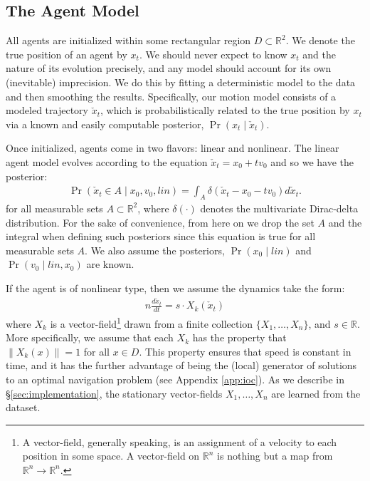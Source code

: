 \documentclass[letterpaper,10pt,conference]{ieeeconf}
\begin{document}
\subsection{The Agent Model}
All agents are initialized within some rectangular region $D \subset \mathbb{R}^2$.
We denote the true position of an agent by $x_t$.
We should never expect to know $x_t$ and the nature of its evolution precisely, and any model should account for its own (inevitable) imprecision.
We do this by fitting a deterministic model to the data and then smoothing the results.
Specifically, our motion model consists of a modeled trajectory $\check{x}_t$, which is probabilistically related to the true position by $x_t$ via a known and easily computable posterior, $\Pr(x_t \mid \check{x}_t)$.

Once initialized, agents come in two flavors: linear and nonlinear.
The linear agent model evolves according to the equation $\check{x}_t = x_0 + t v_0$ and so we have the posterior:
\begin{align}
	\Pr( \check{x}_t  \in A \mid x_0, v_0, lin) = \int_A \delta( \check{x}_t - x_0 - t v_0 ) d\check{x}_t.
\end{align}
for all measurable sets $A \subset \mathbb{R}^2$, where $\delta( \cdot )$ denotes the multivariate Dirac-delta distribution.
For the sake of convenience, from here on we drop the set $A$ and the integral when defining such posteriors since this equation is true for all measurable sets $A$.
We also assume the posteriors, $\Pr(x_0 \mid lin)$ and $\Pr( v_0 \mid lin, x_0)$ are known.

If the agent is of nonlinear type, then we assume the dynamics take the form:
\begin{align}n
	\frac{d \check{x}_t}{dt} = s \cdot X_k(\check{x}_t) \label{eq:ode}
\end{align}
where $X_k$ is a vector-field\footnote{A vector-field, generally speaking, is an assignment of a velocity to each position in some space.  A vector-field on $\mathbb{R}^n$ is nothing but a map from $\mathbb{R}^n \to \mathbb{R}^n$.} drawn from a finite collection $\{X_1, \dots, X_n\}$, and $s \in \mathbb{R}$.
More specifically, we assume that each $X_k$ has the property that $\| X_k(x) \| = 1$ for all $x \in D$.
This property ensures that speed is constant in time, and it has the further advantage of being the (local) generator
of solutions to an optimal navigation problem (see Appendix \ref{app:ioc}).
As we describe in \S \ref{sec:implementation}, the stationary vector-fields $X_1,\dots,X_n$ are learned from the dataset.
\end{document}
